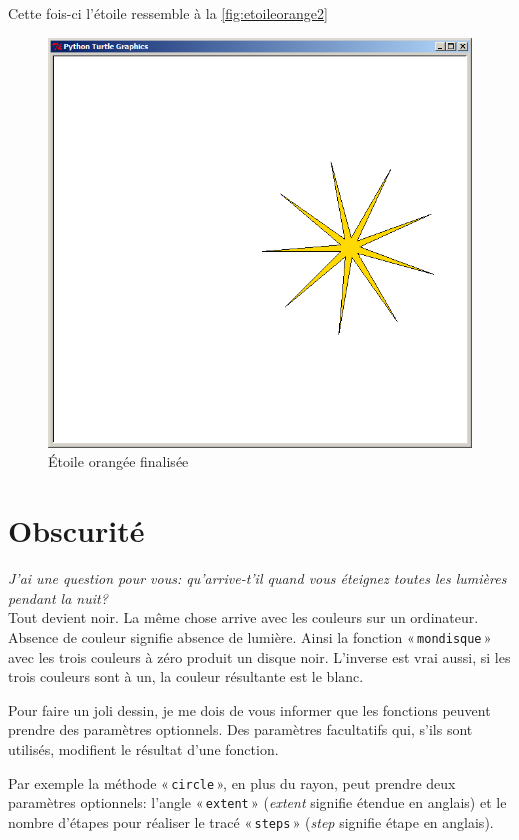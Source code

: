 Cette fois-ci l'étoile ressemble à la \autoref{fig:etoileorange2}
\begin{figure}[h!]
\centering
\includegraphics[scale=0.4]{images/etoileorange2}
\caption{Étoile orangée finalisée}\label{fig:etoileorange2}
\end{figure}

\section{Obscurité}

\emph{J'ai une question pour vous: qu'arrive-t'il quand vous éteignez toutes les lumières pendant la nuit?}\\

Tout devient noir. La même chose arrive avec les couleurs sur un ordinateur. Absence de couleur signifie absence de lumière. Ainsi la fonction « \texttt{mondisque} » avec les trois couleurs à zéro produit un disque noir. L'inverse est vrai aussi, si les trois couleurs sont à un, la couleur résultante est le blanc.

Pour faire un joli dessin, je me dois de vous informer que les fonctions peuvent prendre des paramètres optionnels. Des paramètres facultatifs qui, s'ils sont utilisés, modifient le résultat d'une fonction.

Par exemple la méthode « \texttt{circle} », en plus du rayon, peut prendre deux paramètres optionnels: l'angle « \texttt{extent} » (\emph{extent} signifie étendue en anglais) et le nombre d'étapes pour réaliser le tracé « \texttt{steps} »   (\emph{step} signifie étape en anglais).

